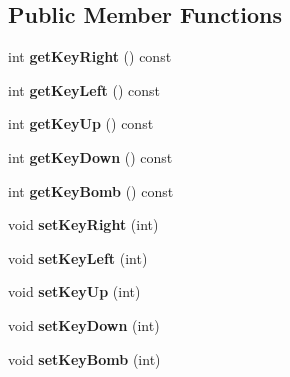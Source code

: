 \subsection*{Public Member Functions}
\begin{DoxyCompactItemize}
\item 
\hypertarget{class_player_ac261beff3dde083a51ac93e2bea78e63}{}int {\bfseries get\+Key\+Right} () const \label{class_player_ac261beff3dde083a51ac93e2bea78e63}

\item 
\hypertarget{class_player_a649d9dc57044817e63c541ed5a06b8ed}{}int {\bfseries get\+Key\+Left} () const \label{class_player_a649d9dc57044817e63c541ed5a06b8ed}

\item 
\hypertarget{class_player_ae99b939c3d9d57780af02beda88ba9ea}{}int {\bfseries get\+Key\+Up} () const \label{class_player_ae99b939c3d9d57780af02beda88ba9ea}

\item 
\hypertarget{class_player_aeaec4c2bd76befa1aa82437c70d7e288}{}int {\bfseries get\+Key\+Down} () const \label{class_player_aeaec4c2bd76befa1aa82437c70d7e288}

\item 
\hypertarget{class_player_a9aded98ed894d9310797d7d75a39ff95}{}int {\bfseries get\+Key\+Bomb} () const \label{class_player_a9aded98ed894d9310797d7d75a39ff95}

\item 
\hypertarget{class_player_a0be0ee940e7314d1d1085e77fde9fbee}{}void {\bfseries set\+Key\+Right} (int)\label{class_player_a0be0ee940e7314d1d1085e77fde9fbee}

\item 
\hypertarget{class_player_afe19846dc1e6098579d380644049e55d}{}void {\bfseries set\+Key\+Left} (int)\label{class_player_afe19846dc1e6098579d380644049e55d}

\item 
\hypertarget{class_player_ad1d666118c0e44a47d6c9f8031d88404}{}void {\bfseries set\+Key\+Up} (int)\label{class_player_ad1d666118c0e44a47d6c9f8031d88404}

\item 
\hypertarget{class_player_ad35219a5e624b5bd5f2a1eee9de28abd}{}void {\bfseries set\+Key\+Down} (int)\label{class_player_ad35219a5e624b5bd5f2a1eee9de28abd}

\item 
\hypertarget{class_player_a45cc57c8b5f7627e65db624c050bf001}{}void {\bfseries set\+Key\+Bomb} (int)\label{class_player_a45cc57c8b5f7627e65db624c050bf001}

\end{DoxyCompactItemize}
